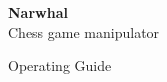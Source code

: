 \documentclass[11pt,fleqn]{book} %
\begin{document}

\begingroup
\thispagestyle{empty}
\centering
\vspace*{5cm}
\par\normalfont\fontsize{35}{35}\sffamily\selectfont
\textbf{Narwhal}\\
{\LARGE Chess game manipulator}\par %
\vspace*{1cm}
{\Huge Operating Guide}\par %
\endgroup

\end{document}
